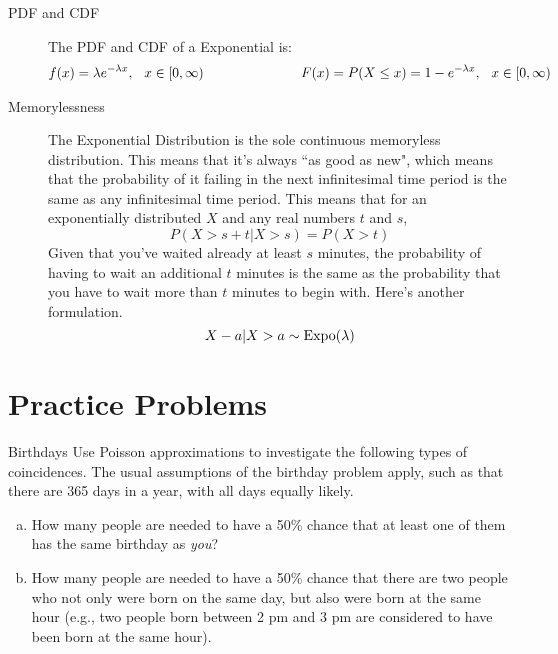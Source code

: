 \documentclass[11.5pt]{article}
\begin{document}
\begin{notes}
\begin{description}
	\item[PDF and CDF] The PDF and CDF of a Exponential is:
\begin{eqnarray*}
f(x) = \lambda e^{-\lambda x},
\hspace{.1 in}
x \in [0, \infty)
\hspace{1 in}
F(x) = P(X \leq x) = 1 - e^{-\lambda x},
\hspace{.1 in}
x \in [0, \infty)
\end{eqnarray*}
	

	\item[Memorylessness] The Exponential Distribution is the sole continuous memoryless distribution. This means that it's always ``as good as new", which means that the probability of it failing in the next infinitesimal time period is the same as any infinitesimal time period. This means that for an exponentially distributed $X$ and any real numbers $t$ and $s$,
	\[P(X > s + t | X > s) = P(X > t)\]
	Given that you've waited already at least $s$ minutes, the probability of having to wait an additional $t$ minutes is the same as the probability that you have to wait more than $t$ minutes to begin with. Here's another formulation.
	\[X - a | X > a \sim \textrm{Expo}(\lambda)\]


\end{description}

\end{notes}
\newpage 
\section*{Practice Problems}

\begin{exercise}{Birthdays}
Use Poisson approximations to investigate the following types of coincidences. The usual assumptions of the birthday problem apply, such as that there are 365 days in a year, with all days equally likely.
\begin{enumerate} [(a)]
\item How many people are needed to have a 50\% chance that at least one of them has the same birthday as \textit{you}?
\item How many people are needed to have a 50\% chance that there are two people who not only were born on the same day, but also were born at the same hour (e.g., two people born between 2 pm and 3 pm are considered to have been born at the same hour).
\end{enumerate}
\end{exercise}
\end{document}
